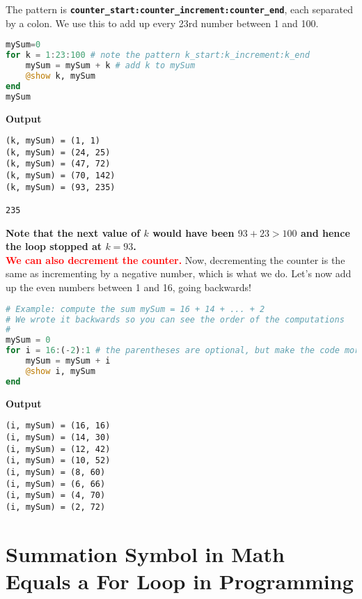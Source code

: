 The pattern is \texttt{\bf counter\_start:counter\_increment:counter\_end}, each separated by a colon. We use this to add up every 23rd number between 1 and 100.
\begin{lstlisting}[language=Julia,style=mystyle]
mySum=0
for k = 1:23:100 # note the pattern k_start:k_increment:k_end
    mySum = mySum + k # add k to mySum
    @show k, mySum
end
mySum
\end{lstlisting}
\textbf{Output} 
\begin{verbatim}
(k, mySum) = (1, 1)
(k, mySum) = (24, 25)
(k, mySum) = (47, 72)
(k, mySum) = (70, 142)
(k, mySum) = (93, 235)

235
\end{verbatim}
\textbf{Note that the next value of $k$ would have been $93 + 23 > 100$ and hence the loop stopped at $k=93$. }\\

\textcolor{red}{\bf We can also decrement the counter.} Now, decrementing the counter is the same as incrementing by a negative number, which is what we do. Let's now add up the even numbers between 1 and 16, going backwards!

\begin{lstlisting}[language=Julia,style=mystyle]
# Example: compute the sum mySum = 16 + 14 + ... + 2
# We wrote it backwards so you can see the order of the computations
#
mySum = 0
for i = 16:(-2):1 # the parentheses are optional, but make the code more clear
    mySum = mySum + i
    @show i, mySum
end
\end{lstlisting}
\textbf{Output} 
\begin{verbatim}
(i, mySum) = (16, 16)
(i, mySum) = (14, 30)
(i, mySum) = (12, 42)
(i, mySum) = (10, 52)
(i, mySum) = (8, 60)
(i, mySum) = (6, 66)
(i, mySum) = (4, 70)
(i, mySum) = (2, 72)
\end{verbatim}


\section{Summation Symbol in Math Equals a For Loop in Programming}

